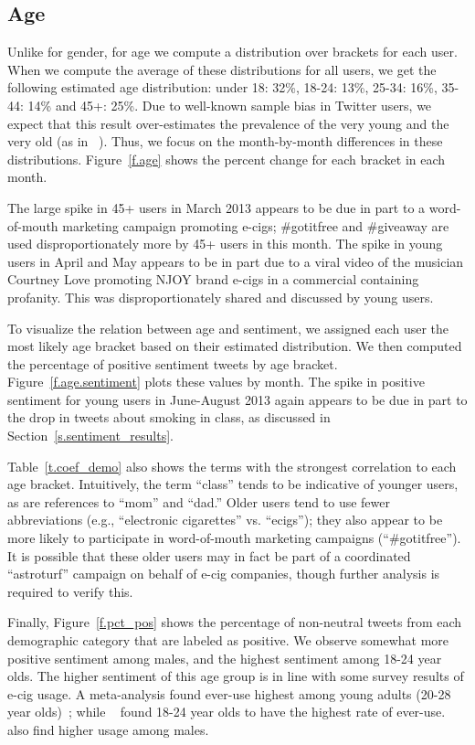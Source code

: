 \documentclass{sig-alternate}
\newcommand{\citenoun}[1]{{\citeauthor{#1}~\cite{#1}}}
\begin{document}
\subsection{Age}
Unlike for gender, for age we compute a distribution over brackets for each
user. When we compute the average of these distributions for all users, we get
the following estimated age distribution: under 18: 32\%, 18-24: 13\%, 25-34:
16\%, 35-44: 14\% and 45+: 25\%. Due to well-known sample bias in Twitter
users, we expect that this result over-estimates the prevalence of the very
young and the very old (as in \citenoun{paval2015confounds}). Thus, we focus
on the month-by-month differences in these distributions. Figure~\ref{f.age}
shows the percent change for each bracket in each month.

The large spike in 45+ users in March 2013 appears to be due in part to a
word-of-mouth marketing campaign promoting e-cigs; \#gotitfree and \#giveaway
are used disproportionately more by 45+ users in this month. The spike in
young users in April and May appears to be in part due to a viral video of the
musician Courtney Love promoting NJOY brand e-cigs in a commercial containing
profanity. This was disproportionately shared and discussed by young users.

To visualize the relation between age and sentiment, we assigned each user the most likely age bracket based on their estimated distribution. We then computed the percentage of positive sentiment tweets by age bracket. Figure~\ref{f.age.sentiment} plots these values by month. The spike in positive sentiment for young users in June-August 2013 again appears to be due in part to the drop in tweets about smoking in class, as discussed in Section~\ref{s.sentiment_results}.

Table~\ref{t.coef_demo} also shows the terms with the strongest correlation to each age bracket. Intuitively, the term ``class'' tends to be indicative of younger users, as are references to ``mom'' and ``dad.'' Older users tend to use fewer abbreviations (e.g., ``electronic cigarettes'' vs. ``ecigs''); they also appear to be more likely to participate in word-of-mouth marketing campaigns (``\#gotitfree''). It is possible that these older users may in fact be part of a coordinated ``astroturf'' campaign on behalf of e-cig companies, though further analysis is required to verify this.

Finally, Figure~\ref{f.pct_pos} shows the percentage of non-neutral tweets from each
demographic category that are labeled as positive. We observe somewhat more
positive sentiment among males, and the highest sentiment among 18-24 year
olds.  The higher sentiment of this age group is in line with some survey
results of e-cig usage. A meta-analysis found ever-use highest among young
adults (20-28 year olds)~\cite{chapman2014cigarette}; while
\citenoun{regan2013electronic} found 18-24 year olds to have the highest rate
of ever-use. \citenoun{pearson2012cigarette} also find higher usage among
males.
\end{document}
